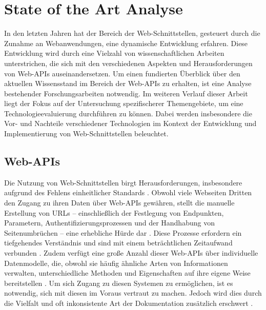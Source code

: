 \documentclass[draft,final]{vutinfth} %
\begin{document}
\chapter{State of the Art Analyse}
\label{chap:stateOfTheArt}

In den letzten Jahren hat der Bereich der Web-Schnittstellen, gesteuert durch die Zunahme an Webanwendungen, eine dynamische Entwicklung erfahren. Diese Entwicklung wird durch eine Vielzahl von wissenschaftlichen Arbeiten unterstrichen, die sich mit den verschiedenen Aspekten und Herausforderungen von Web-APIs auseinandersetzen. 
Um einen fundierten Überblick über den aktuellen Wissensstand im Bereich der Web-APIs zu erhalten, ist eine Analyse bestehender Forschungsarbeiten notwendig.  
Im weiteren Verlauf dieser Arbeit liegt der Fokus auf der Untersuchung spezifischerer Themengebiete, um eine Technologieevaluierung durchführen zu können. 
Dabei werden insbesondere die Vor- und Nachteile verschiedener Technologien im Kontext der Entwicklung und Implementierung von Web-Schnittstellen beleuchtet.


\section{Web-APIs}

Die Nutzung von Web-Schnittstellen birgt Herausforderungen, insbesondere aufgrund des Fehlens einheitlicher Standards \cite{Alrashed:2021:StandardizingAPIs}. 
Obwohl viele Webseiten Dritten den Zugang zu ihren Daten über Web-APIs gewähren, stellt die manuelle Erstellung von URLs -- einschließlich der Festlegung von Endpunkten, Parametern, Authentifizierungsprozessen und der Handhabung von Seitenumbrüchen -- eine erhebliche Hürde dar 
\cite{Alrashed:2021:StandardizingAPIs, Maleshkova:2010:InvestigationWebAPIs}. 
Diese Prozesse erfordern ein tiefgehendes Verständnis und sind mit einem beträchtlichen Zeitaufwand verbunden \cite{Alrashed:2021:StandardizingAPIs}. 
Zudem verfügt eine große Anzahl dieser Web-APIs über individuelle Datenmodelle, die, obwohl sie häufig ähnliche Arten von Informationen verwalten, unterschiedliche Methoden und Eigenschaften auf ihre eigene Weise bereitstellen \cite{Alrashed:2021:StandardizingAPIs}.
Um sich Zugang zu diesen Systemen zu ermöglichen, ist es notwendig, sich mit diesen im Voraus vertraut zu machen. 
Jedoch wird dies durch die Vielfalt und oft inkonsistente Art der Dokumentation zusätzlich erschwert \cite{Maleshkova:2010:InvestigationWebAPIs}.
\end{document}
